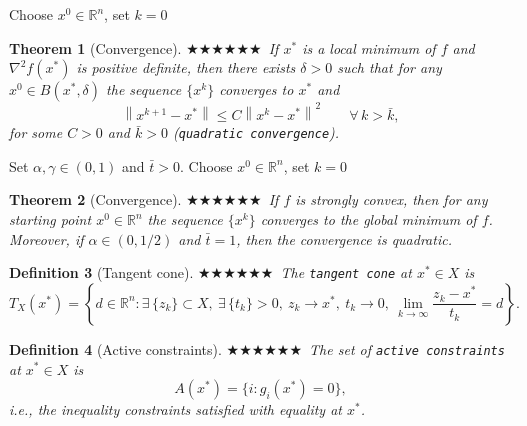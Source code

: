 \documentclass[11pt,a4paper]{article}
\newcommand{\g}{\texttt}
\newcommand{\R}{\mathbb{R}}
\newcommand{\norm}[1]{\left\lVert #1 \right\rVert}
\theoremstyle{breakdef}
\newtheorem{definition}{Definition}[section]
\theoremstyle{breakplain}
\newtheorem{theorem}[definition]{Theorem}
\theoremstyle{remark}
\newcommand{\imp}[1]{\textcolor{impcolor}{%
  \ifcase#1\or$\bigstar$\or$\bigstar\bigstar$\or$\bigstar\bigstar\bigstar$\fi}\ }
\begin{document}
\begin{algorithm}[H]
\caption{\imp{3}Newton method (basic version)}
Choose $x^0 \in \R^n$, set $k = 0$\;
\end{algorithm}

\begin{theorem}[Convergence]
    \imp{2}If $x^*$ is a local minimum of $f$ and $\nabla^2 f(x^*)$ is positive definite, then there exists $\delta > 0$ such that for any $x^0 \in B(x^*, \delta)$ the sequence $\{x^k\}$ converges to $x^*$ and
    \[
        \norm{x^{k+1} - x^*} \le C\norm{x^k - x^*}^2 \qquad \forall\, k > \bar{k},
    \]
    for some $C > 0$ and $\bar{k} > 0$ (\g{quadratic convergence}).
\end{theorem}

\begin{algorithm}[H]
\caption{\imp{3}Newton method with (inexact) line search}
Set $\alpha, \gamma \in (0,1)$ and $\bar{t} > 0$. Choose $x^0 \in \R^n$, set $k = 0$\;
\end{algorithm}

\begin{theorem}[Convergence]
    \imp{2}If $f$ is strongly convex, then for any starting point $x^0 \in \R^n$ the sequence $\{x^k\}$ converges to the global minimum of $f$. Moreover, if $\alpha \in (0, 1/2)$ and $\bar{t} = 1$, then the convergence is quadratic.
\end{theorem}

\begin{definition}[Tangent cone]
    \imp{2}The \g{tangent cone} at $x^* \in X$ is
    \[
        T_X(x^*) = \left\{ d \in \R^n : \exists\, \{z_k\} \subset X,\ \exists\, \{t_k\} > 0,\ z_k \to x^*,\ t_k \to 0,\ \lim_{k \to \infty} \frac{z_k - x^*}{t_k} = d \right\}.
    \]
\end{definition}

\begin{definition}[Active constraints]
    \imp{3}The set of \g{active constraints} at $x^* \in X$ is
    \[
        A(x^*) = \{i : g_i(x^*) = 0\},
    \]
    i.e., the inequality constraints satisfied with equality at $x^*$.
\end{definition}
\end{document}

